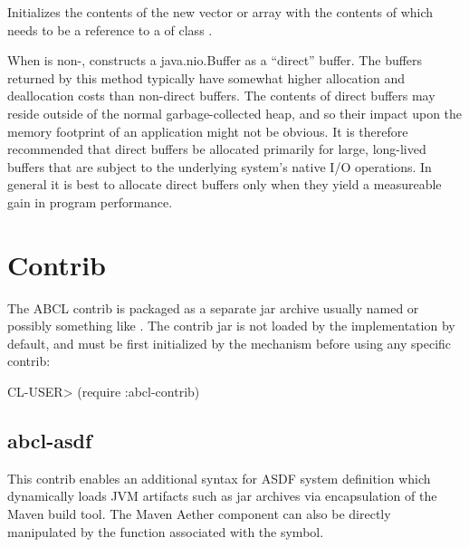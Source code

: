 \documentclass[10pt]{book}
\begin{document}
\begin{description}[style=nextline]

\item[\code{:nio-buffer NIO-BUFFER}]

Initializes the contents of the new vector or array with the contents
of  which needs to be a reference to a
 of class .

\item[\code{:nio-direct NIO-DIRECT-P}]

When  is non-, constructs a
java.nio.Buffer as a ``direct'' buffer.  The buffers returned by this
method typically have somewhat higher allocation and deallocation
costs than non-direct buffers. The contents of direct buffers may
reside outside of the normal garbage-collected heap, and so their
impact upon the memory footprint of an application might not be
obvious. It is therefore recommended that direct buffers be allocated
primarily for large, long-lived buffers that are subject to the
underlying system's native I/O operations. In general it is best to
allocate direct buffers only when they yield a measureable gain in
program performance.

\end{description}


\chapter{Contrib}

The \textsc{ABCL} contrib is packaged as a separate jar archive usually named
 or possibly something like
.  The contrib jar is not loaded by the
implementation by default, and must be first initialized by the
 mechanism before using any specific contrib:

\begin{listing-lisp}
CL-USER> (require :abcl-contrib)
\end{listing-lisp}

\section{abcl-asdf}
\label{sec:abcl-asdf}

This contrib enables an additional syntax for \textsc{ASDF} system
definition which dynamically loads \textsc{JVM} artifacts such as jar
archives via encapsulation of the Maven build tool.  The Maven Aether
component can also be directly manipulated by the function associated
with the  symbol.
\end{document}
